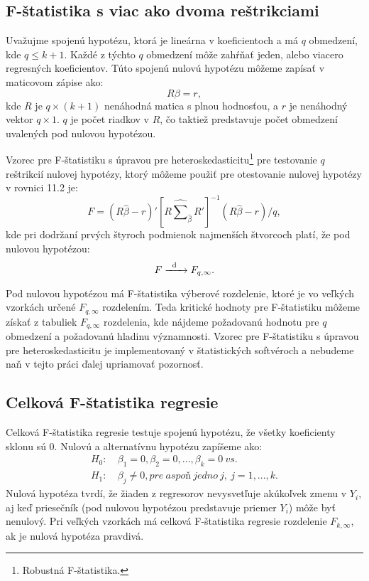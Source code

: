 \documentclass[]{tukediphc}
\begin{document}
\subsection{F-štatistika s viac ako dvoma reštrikciami}

Uvažujme spojenú hypotézu, ktorá je lineárna v koeficientoch a má $q$ obmedzení, kde $q \leq k + 1$. Každé z týchto $q$ obmedzení môže zahŕňať jeden, alebo viacero regresných koeficientov. Túto spojenú nulovú hypotézu môžeme zapísať v maticovom zápise ako:
\begin{equation}
    R\beta = r,
\end{equation}
kde $R$ je $q \times (k + 1)$ nenáhodná matica s plnou hodnosťou, a $r$ je nenáhodný vektor $q \times 1$. $q$ je počet riadkov v $R$, čo taktiež predstavuje počet obmedzení uvalených pod nulovou hypotézou. 

Vzorec pre F-štatistiku s úpravou pre heteroskedasticitu\footnote{Robustná F-štatistika.} pre testovanie $q$ reštrikcií nulovej hypotézy, ktorý môžeme použiť pre otestovanie nulovej hypotézy v rovnici 11.2 je:
\begin{equation}
    F = (R\hat{\beta}-r)'[R\hat{\sum}_{\hat{\beta}}R']^{-1}(R\hat{\beta}-r)/q,
\end{equation}
kde pri dodržaní prvých štyroch podmienok najmenších štvorcoch platí, že pod nulovou hypotézou:
\begin{equation}
    F \xrightarrow[\text{}]{\text{\; d \; }} F_{q, \infty}.
\end{equation}
Pod nulovou hypotézou má F-štatistika výberové rozdelenie, ktoré je vo veľkých vzorkách určené $F_{q, \infty}$ rozdelením. Teda kritické hodnoty pre F-štatistiku môžeme získať z tabuliek $F_{q, \infty}$ rozdelenia, kde nájdeme požadovanú hodnotu pre $q$ obmedzení a požadovanú hladinu významnosti.
Vzorec pre F-štatistiku s úpravou pre heteroskedasticitu je implementovaný v štatistických softvéroch a nebudeme naň v tejto práci ďalej upriamovať pozornosť. 

\subsection{Celková F-štatistika regresie}

Celková F-štatistika regresie testuje spojenú hypotézu, že všetky koeficienty sklonu sú 0. Nulovú a alternatívnu hypotézu zapíšeme ako:
\begin{equation}
\begin{split}
    H_{0}: & \ \beta_{1} = 0, \beta_{2} = 0, ..., \beta_{k} = 0 \ vs. \\
    H_{1}: & \ \beta_{j} \neq 0, pre \ aspoň \ jedno \ j,\ j=1, ..., k.
\end{split}
\end{equation}
Nulová hypotéza tvrdí, že žiaden z regresorov nevysvetľuje akúkoľvek zmenu v $Y_i$, aj keď priesečník (pod nulovou hypotézou predstavuje priemer $Y_i$) môže byť nenulový. Pri veľkých vzorkách má celková F-štatistika regresie rozdelenie $F_{k,\infty}$, ak je nulová hypotéza pravdivá.
\end{document}

